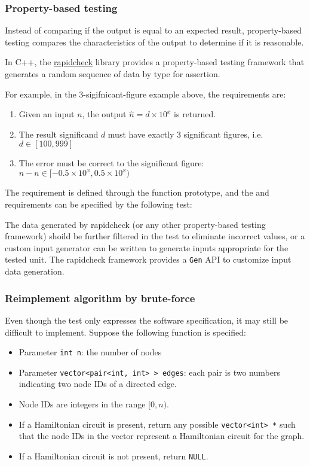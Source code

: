 \subsubsection{Property-based testing}
Instead of comparing if the output is equal to an expected result,
property-based testing compares the characteristics of the output to determine if it is reasonable.

In C++, the \href{https://github.com/emil-e/rapidcheck}{rapidcheck} library
provides a property-based testing framework that generates a random sequence of data by type for assertion.

For example, in the 3-sigifnicant-figure example above, the requirements are:

\begin{enumerate}
	\item Given an input $n$, the output $\hat{n} = d \times 10^{x}$ is returned.
	\item The result significand $d$ must have exactly 3 significant figures, i.e. $d \in [100, 999]$
	\item The error must be correct to the  significant figure: $\hat{n} - n \in [-0.5 \times 10^{x}, 0.5 \times 10^{x})$
\end{enumerate}

The  requirement is defined through the function prototype,
and the  and  requirements can be specified by the following test:


The data generated by rapidcheck (or any other property-based testing framework) shoild be further filtered
in the test to eliminate incorrect values, or a custom input generator can be written to
generate inputs appropriate for the tested unit.
The rapidcheck framework provides a \texttt{Gen} API to customize input data generation.

\subsubsection{Reimplement algorithm by brute-force}
Even though the test only expresses the software specification, it may still be difficult to implement.
Suppose the following function is specified:

\begin{itemize}
	\item Parameter \texttt{int n}: the number of nodes
	\item Parameter \texttt{vector<pair<int, int> > edges}: each pair is two numbers indicating two node IDs of a directed edge.
	\item Node IDs are integers in the range $[0, n)$.
	\item If a Hamiltonian circuit is present, return any possible \texttt{vector<int> *} such that
		the node IDs in the vector represent a Hamiltonian circuit for the graph.
	\item If a Hamiltonian circuit is not present, return \texttt{NULL}.
\end{itemize}

